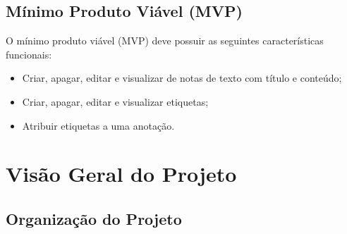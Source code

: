 \documentclass[
	12pt,				%
	oneside,			%
	a4paper,			%
	english,			%
	brazil,				%
	]{abntex2}
\begin{document}
\section{Mínimo Produto Viável (MVP)}
O mínimo produto viável (MVP) deve possuir as seguintes características funcionais:
\begin{itemize}
    \item Criar, apagar, editar e visualizar de notas de texto com título e conteúdo;
    \item Criar, apagar, editar e visualizar etiquetas;
    \item Atribuir etiquetas a uma anotação.
\end{itemize}

\chapter{Visão Geral do Projeto}
\section{Organização do Projeto}
\end{document}
